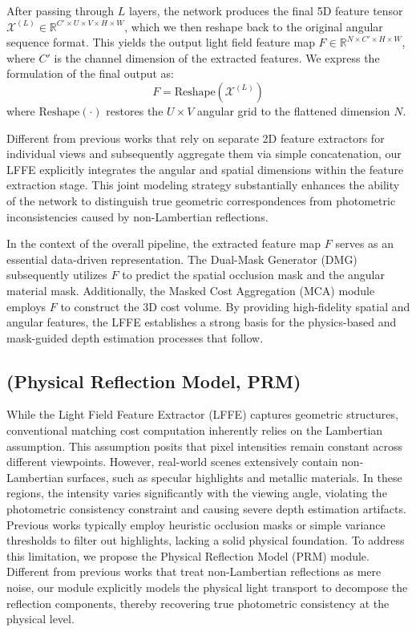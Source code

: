 \documentclass[lettersize,journal]{IEEEtran}
\begin{document}
After passing through $L$ layers, the network produces the final 5D feature tensor $\mathcal{X}^{(L)} \in \mathbb{R}^{C' \times U \times V \times H \times W}$, which we then reshape back to the original angular sequence format. This yields the output light field feature map $F \in \mathbb{R}^{N \times C' \times H \times W}$, where $C'$ is the channel dimension of the extracted features. We express the formulation of the final output as:
\begin{equation}
\label{eq:eq2}
F = \text{Reshape}\left( \mathcal{X}^{(L)} \right)
\end{equation}
where $\text{Reshape}(\cdot)$ restores the $U \times V$ angular grid to the flattened dimension $N$. 

Different from previous works that rely on separate 2D feature extractors for individual views and subsequently aggregate them via simple concatenation, our LFFE explicitly integrates the angular and spatial dimensions within the feature extraction stage. This joint modeling strategy substantially enhances the ability of the network to distinguish true geometric correspondences from photometric inconsistencies caused by non-Lambertian reflections. 

In the context of the overall pipeline, the extracted feature map $F$ serves as an essential data-driven representation. The Dual-Mask Generator (DMG) subsequently utilizes $F$ to predict the spatial occlusion mask and the angular material mask. Additionally, the Masked Cost Aggregation (MCA) module employs $F$ to construct the 3D cost volume. By providing high-fidelity spatial and angular features, the LFFE establishes a strong basis for the physics-based and mask-guided depth estimation processes that follow.

\subsection{(Physical Reflection Model, PRM)}

While the Light Field Feature Extractor (LFFE) captures geometric structures, conventional matching cost computation inherently relies on the Lambertian assumption. This assumption posits that pixel intensities remain constant across different viewpoints. However, real-world scenes extensively contain non-Lambertian surfaces, such as specular highlights and metallic materials. In these regions, the intensity varies significantly with the viewing angle, violating the photometric consistency constraint and causing severe depth estimation artifacts. Previous works typically employ heuristic occlusion masks or simple variance thresholds to filter out highlights, lacking a solid physical foundation. To address this limitation, we propose the Physical Reflection Model (PRM) module. Different from previous works that treat non-Lambertian reflections as mere noise, our module explicitly models the physical light transport to decompose the reflection components, thereby recovering true photometric consistency at the physical level.
\end{document}
